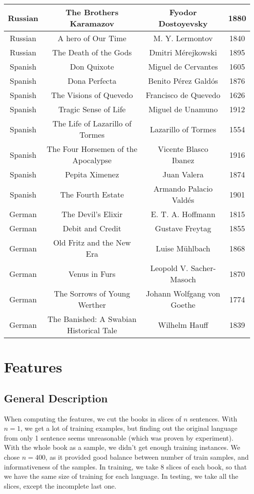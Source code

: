 \documentclass[10pt]{article}
\begin{document}
\begin{tabular}{|c|c|c|c|}
\hline 
Russian & The Brothers Karamazov & Fyodor Dostoyevsky & 1880\tabularnewline
\hline 
Russian & A hero of Our Time  & M. Y. Lermontov & 1840\tabularnewline
\hline 
Russian & The Death of the Gods & Dmitri Mérejkowski & 1895\tabularnewline
\hline 
\hline 
Spanish & Don Quixote & Miguel de Cervantes & 1605\tabularnewline
\hline 
Spanish & Dona Perfecta & Benito Pérez Galdós & 1876\tabularnewline
\hline 
Spanish & The Visions of Quevedo & Francisco de Quevedo & 1626\tabularnewline
\hline 
Spanish & Tragic Sense of Life & Miguel de Unamuno & 1912\tabularnewline
\hline 
Spanish & The Life of Lazarillo of Tormes & Lazarillo of Tormes & 1554\tabularnewline
\hline 
Spanish & The Four Horsemen of the Apocalypse & Vicente Blasco Ibanez & 1916\tabularnewline
\hline 
Spanish & Pepita Ximenez & Juan Valera & 1874\tabularnewline
\hline 
Spanish & The Fourth Estate & Armando Palacio Valdés & 1901\tabularnewline
\hline 
\hline 
German & The Devil's Elixir & E. T. A. Hoffmann & 1815\tabularnewline
\hline 
German & Debit and Credit & Gustave Freytag  & 1855\tabularnewline
\hline 
German & Old Fritz and the New Era & Luise Mühlbach & 1868\tabularnewline
\hline 
German & Venus in Furs & Leopold V. Sacher-Masoch  & 1870\tabularnewline
\hline 
German & The Sorrows of Young Werther & Johann Wolfgang von Goethe & 1774\tabularnewline
\hline 
German & The Banished: A Swabian Historical Tale & Wilhelm Hauff & 1839\tabularnewline
\hline 
\end{tabular}

\section{Features}
\subsection{General Description}
When computing the features, we cut the books in slices of $n$ sentences. With $n=1$, we get a lot of training examples, but finding out the original language from only 1 sentence seems unreasonable (which was proven by experiment). With the whole book as a sample, we didn't get enough training instances. We chose $n=400$, as it provided good balance between number of train samples, and informativeness of the samples. In training, we take 8 slices of each book, so that we have the same size of training for each language. In testing, we take all the slices, except the incomplete last one.
\end{document}
